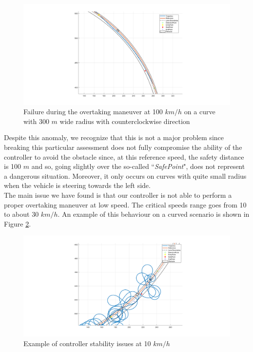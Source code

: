 \begin{figure}[H]
    \centering
    \includegraphics[width=1.1\textwidth,keepaspectratio]{Figures/fail100kmh.png}
    \caption{Failure during the overtaking maneuver at 100 $km/h$ on a curve with 300 $m$ wide radius with counterclockwise direction }
    \label{fig:fail100kmh}
\end{figure}
Despite this anomaly, we recognize that this is not a major problem since breaking this particular assessment does not fully compromise the ability of the controller to avoid the obstacle since, at this reference speed, the safety distance is 100 $m$ and so, going slightly over the so-called ``\textit{SafePoint}", does not represent a dangerous situation. Moreover, it only occurs on curves with quite small radius when the vehicle is steering towards the left side.\\


The main issue we have found is that our controller is not able to perform a proper overtaking maneuver at low speed. The critical speeds range goes from 10 to about 30 $km/h$. An example of this behaviour on a curved scenario is shown in Figure \ref{fig:controller_madness}.
\begin{figure}[H]
    \centering
    \includegraphics[width=1\textwidth,keepaspectratio]{Figures/Failed300m10kmh.png}
    \caption{Example of controller stability issues at 10 $km/h$}
    \label{fig:controller_madness}
\end{figure}

